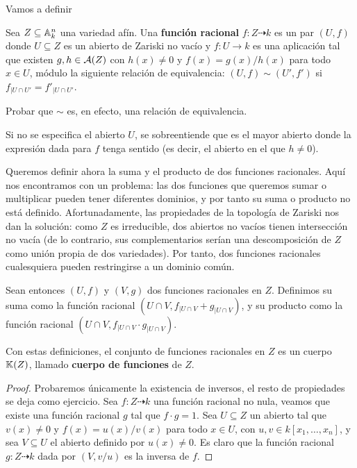 \documentclass[ACGA.tex]{subfiles}
\begin{document}
Vamos a definir 
\begin{defi}
 Sea $Z\subseteq\mathbb{A}^n_k$ una variedad afín. Una {\bf función racional} $f:Z\dashrightarrow k$ es un par $(U,f)$ donde $U\subseteq Z$ es un abierto de Zariski no vacío y $f:U\to k$ es una aplicación tal que existen $g,h\in {\mathcal A}(Z)$ con $h(x)\neq 0$ y $f(x)=g(x)/h(x)$ para todo $x\in U$, módulo la siguiente relación de equivalencia: $(U,f)\sim(U',f')$ si $f_{|U\cap U'}=f'_{|U\cap U'}$.
\end{defi}

\begin{ejer}
 Probar que $\sim$ es, en efecto, una relación de equivalencia.
\end{ejer}


Si no se especifica el abierto $U$, se sobreentiende que es el mayor abierto donde la expresión dada para $f$ tenga sentido (es decir, el abierto en el que $h\neq 0$).


Queremos definir ahora la suma y el producto de dos funciones racionales. Aquí nos encontramos con un problema: las dos funciones que queremos sumar o multiplicar pueden tener diferentes dominios, y por tanto su suma o producto no está definido. Afortunadamente, las propiedades de la topología de Zariski nos dan la solución: como $Z$ es irreducible, dos abiertos no vacíos tienen intersección no vacía (de lo contrario, sus complementarios serían una descomposición de $Z$ como unión propia de dos variedades). Por tanto, dos funciones racionales cualesquiera pueden restringirse a un dominio común. 

Sean entonces $(U,f)$ y $(V,g)$ dos funciones racionales en $Z$. Definimos su suma como la función racional $(U\cap V,f_{|U\cap V}+g_{|U\cap V})$, y su producto como la función racional $(U\cap V,f_{|U\cap V}\cdot g_{|U\cap V})$.

\begin{prop}
 Con estas definiciones, el conjunto de funciones racionales en $Z$ es un cuerpo $\mathbb{K}(Z)$, llamado {\bf cuerpo de funciones} de $Z$.
\end{prop}

\begin{proof}
 Probaremos únicamente la existencia de inversos, el resto de propiedades se deja como ejercicio. Sea $f:Z\dashrightarrow k$ una función racional no nula, veamos que existe una función racional $g$ tal que $f\cdot g=1$. Sea $U\subseteq Z$ un abierto tal que $v(x)\neq 0$ y $f(x)=u(x)/v(x)$ para todo $x\in U$, con $u,v\in k[x_1,\ldots,x_n]$, y sea $V\subseteq U$ el abierto definido por $u(x)\neq 0$. Es claro que la función racional $g:Z\dashrightarrow k$ dada por $(V,v/u)$ es la inversa de $f$.  
\end{proof}
\end{document}
